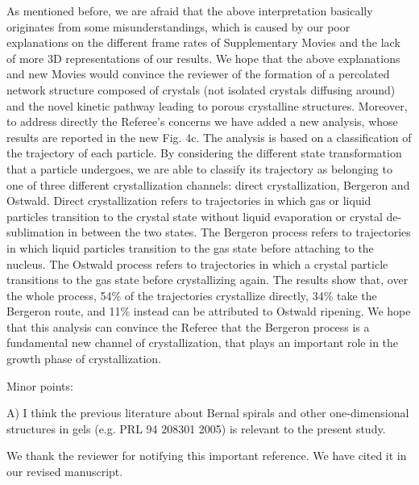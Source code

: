 \documentclass[11pt]{article}
\begin{document}
As mentioned before, we are afraid that the above interpretation basically originates from some misunderstandings, which is caused by our poor explanations on the different frame rates of Supplementary Movies and the lack of more 3D representations of our results. We hope that the above explanations and new Movies would convince the reviewer of the formation of a percolated network structure composed of crystals (not isolated crystals diffusing around) and the novel kinetic pathway leading to porous crystalline structures.
Moreover, to address directly the Referee's concerns we have added a new analysis, whose results are reported in the new Fig. 4c.
The analysis is based on a classification of the trajectory of
each particle. By considering the different state transformation that a particle undergoes, we are able to classify its trajectory as belonging to one of three different crystallization channels: direct crystallization, Bergeron and Ostwald. Direct crystallization refers to trajectories in
which gas or liquid particles transition to the crystal state without liquid evaporation or crystal de-sublimation in between the two states.
The Bergeron process refers to trajectories in which liquid particles transition to the gas state before attaching to the nucleus. The Ostwald
process refers to trajectories in which a crystal particle transitions to the gas state before crystallizing again.
The results show that, over the whole process, 54\% of the trajectories crystallize directly, 34\% take the Bergeron route, and
11\% instead can be attributed to Ostwald ripening. We hope that this analysis can convince the Referee that the Bergeron process is a
fundamental new channel of crystallization, that plays an important role in the growth phase of crystallization.


\vspace{1em}

\singlespacing

{\bf

Minor points:

A) I think the previous literature about Bernal spirals and other one-dimensional structures in gels (e.g. PRL 94 208301 2005) is relevant to the present study.
}




\bigskip
\doublespacing

We thank the reviewer for notifying this important reference. We have cited it in our revised manuscript. 


\vspace{1em}
\end{document}
